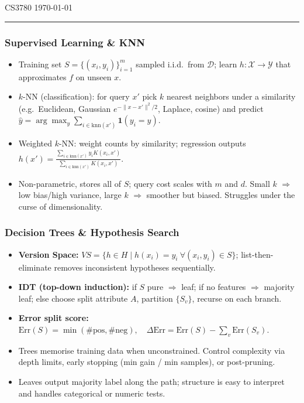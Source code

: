 \documentclass[10pt]{article}
\begin{document}
\begin{center}
    \normalsize CS3780 \hfill \today
\end{center}

\vspace{-1em}
\hrule
\vspace{0.5em}

\begin{multicols}{2}

\subsubsection*{Supervised Learning \& KNN}
\begin{itemize}
    \item Training set $S=\{(x_i,y_i)\}_{i=1}^m$ sampled i.i.d.\ from $\mathcal{D}$; learn $h:\mathcal{X}\rightarrow\mathcal{Y}$ that approximates $f$ on unseen $x$.
    \item $k$-NN (classification): for query $x'$ pick $k$ nearest neighbors under a similarity (e.g.\ Euclidean, Gaussian $e^{-\|x-x'\|^2/2}$, Laplace, cosine) and predict $\hat{y}=\arg\max_y\sum_{i\in\mathrm{knn}(x')} \mathbf{1}(y_i=y)$.
    \item Weighted $k$-NN: weight counts by similarity; regression outputs $\displaystyle h(x')=\frac{\sum_{i\in\mathrm{knn}(x')} y_i K(x_i,x')}{\sum_{i\in\mathrm{knn}(x')} K(x_i,x')}$.
    \item Non-parametric, stores all of $S$; query cost scales with $m$ and $d$. Small $k$ $\Rightarrow$ low bias/high variance, large $k$ $\Rightarrow$ smoother but biased. Struggles under the curse of dimensionality.
\end{itemize}

\subsubsection*{Decision Trees \& Hypothesis Search}
\begin{itemize}
    \item \textbf{Version Space:} $VS=\{h\in H \mid h(x_i)=y_i\ \forall(x_i,y_i)\in S\}$; list-then-eliminate removes inconsistent hypotheses sequentially.
    \item \textbf{IDT (top-down induction):} if $S$ pure $\Rightarrow$ leaf; if no features $\Rightarrow$ majority leaf; else choose split attribute $A$, partition $\{S_v\}$, recurse on each branch.
    \item \textbf{Error split score:} $\text{Err}(S)=\min(\#\text{pos},\#\text{neg}),\quad \Delta \text{Err}=\text{Err}(S)-\sum_v \text{Err}(S_v)$.
    \item Trees memorise training data when unconstrained. Control complexity via depth limits, early stopping (min gain / min samples), or post-pruning.
    \item Leaves output majority label along the path; structure is easy to interpret and handles categorical or numeric tests.
\end{itemize}


\end{multicols}
\end{document}

